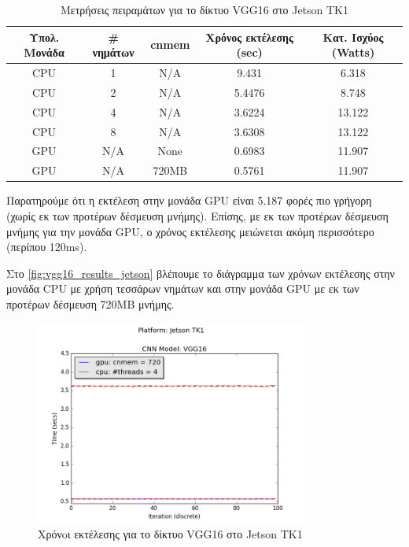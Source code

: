 \begin{table}[H]
  \begin{center}
    \caption{Μετρήσεις πειραμάτων για το δίκτυο VGG16 στο Jetson TK1}
    \label{tab:vgg16_jetson}
    \small
    \begin{tabular}[center]{ | c | c | c | c | c | }
      \hline
      \rowcolor{Gray}
      Υπολ. Μονάδα & \# νημάτων & cnmem & Χρόνος εκτέλεσης (sec) & Κατ. Ισχύος (Watts) \\
      \hline
      CPU & 1 & N/A & 9.431 & 6.318 \\
      CPU & 2 & N/A & 5.4476 &  8.748\\
      CPU & 4 & N/A & 3.6224 & 13.122\\
      CPU & 8 & N/A & 3.6308 & 13.122\\
      GPU & N/A & None & 0.6983 & 11.907\\
      GPU & N/A & 720MB & 0.5761 & 11.907\\
      \hline
    \end{tabular}
  \end{center}
\end{table}

Παρατηρούμε ότι η εκτέλεση στην μονάδα GPU είναι 5.187 φορές πιο
γρήγορη (χωρίς εκ των προτέρων δέσμευση μνήμης).
Επίσης, με εκ των προτέρων δέσμευση μνήμης για την μονάδα GPU, ο χρόνος εκτέλεσης μειώνεται ακόμη
περισσότερο (περίπου 120ms).

Στο \autoref{fig:vgg16_results_jetson} βλέπουμε το διάγραμμα
των χρόνων εκτέλεσης στην μονάδα CPU με χρήση τεσσάρων νημάτων και στην μονάδα
GPU με εκ των προτέρων δέσμευση 720MB μνήμης.

\begin{figure}[!ht]
  \centering
  \includegraphics[width=0.8\textwidth]{./images/chapter6/benchmark_vgg16_jetson.png}
  \caption[Χρόνoι εκτέλεσης για το δίκτυο VGG16 στο Jetson TK1]{Χρόνoι εκτέλεσης για το δίκτυο VGG16 στο Jetson TK1}
  \label{fig:vgg16_results_jetson}
\end{figure}


